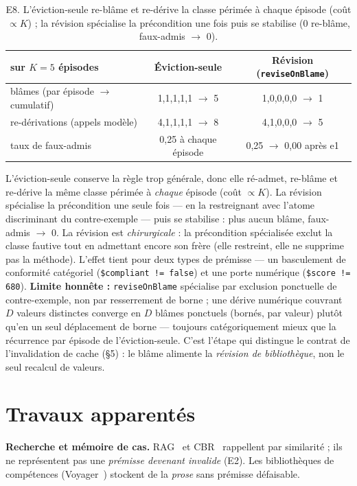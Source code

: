 \documentclass[11pt]{article}
\begin{document}
\begin{table}[h]\centering
\begin{tabular}{lcc}
\toprule
sur $K{=}5$ épisodes & Éviction-seule & Révision (\texttt{reviseOnBlame}) \\
\midrule
blâmes (par épisode $\to$ cumulatif) & 1,1,1,1,1 $\to$ 5 & 1,0,0,0,0 $\to$ 1 \\
re-dérivations (appels modèle) & 4,1,1,1,1 $\to$ 8 & 4,1,0,0,0 $\to$ 5 \\
taux de faux-admis & 0,25 à chaque épisode & 0,25 $\to$ 0,00 après e1 \\
\bottomrule
\end{tabular}
\caption{E8. L'éviction-seule re-blâme et re-dérive la classe périmée à chaque épisode (coût $\propto K$) ; la révision spécialise la précondition une fois puis se stabilise (0 re-blâme, faux-admis $\to$ 0).}
\label{tab:e8}
\end{table}

L'éviction-seule conserve la règle trop générale, donc elle ré-admet, re-blâme et re-dérive la même classe périmée
à \emph{chaque} épisode (coût $\propto K$). La révision spécialise la précondition une seule fois --- en la
restreignant avec l'atome discriminant du contre-exemple --- puis se stabilise : plus aucun blâme, faux-admis
$\to$ 0. La révision est \emph{chirurgicale} : la précondition spécialisée exclut la classe fautive tout en
admettant encore son frère (elle restreint, elle ne supprime pas la méthode). L'effet tient pour deux types de
prémisse --- un basculement de conformité catégoriel (\texttt{\$compliant != false}) et une porte numérique
(\texttt{\$score != 680}). \textbf{Limite honnête :} \texttt{reviseOnBlame} spécialise par exclusion ponctuelle de
contre-exemple, non par resserrement de borne ; une dérive numérique couvrant $D$ valeurs distinctes converge en
$D$ blâmes ponctuels (bornés, par valeur) plutôt qu'en un seul déplacement de borne --- toujours catégoriquement
mieux que la récurrence par épisode de l'éviction-seule. C'est l'étape qui distingue le contrat de l'invalidation
de cache (\S5) : le blâme alimente la \emph{révision de bibliothèque}, non le seul recalcul de valeurs.

\section{Travaux apparentés}
\textbf{Recherche et mémoire de cas.} RAG~\cite{lewis2020} et CBR~\cite{aamodt1994} rappellent par similarité ; ils ne représentent
pas une \emph{prémisse devenant invalide} (E2). Les bibliothèques de compétences (Voyager~\cite{wang2023}) stockent
de la \emph{prose} sans prémisse défaisable.
\end{document}

